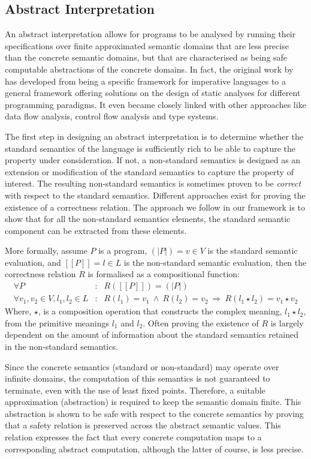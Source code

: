 \documentclass[10pt,a4paper,final,oneside,fleqn]{book}
\begin{document}
\subsection{Abstract Interpretation\label{introai}}
An abstract interpretation allows for programs to be analysed by running their specifications over finite approximated semantic domains that are less precise than the concrete semantic domains, but that are characterised as being safe computable abstractions of the concrete domains.  In fact, the original work by \cite{cousot1} has developed from being a specific framework for imperative languages to a general framework offering solutions on the design of static analyses for different programming paradigms.  It even became closely linked with other approaches like data flow analysis, control flow analysis and type systems.

The first step in designing an abstract interpretation is to determine whether the standard semantics of the language is sufficiently rich to be able to capture the property under consideration.  If not, a non-standard semantics is designed as an extension or modification of the standard semantics to capture the property of interest.  The resulting non-standard semantics is sometimes proven to be {\itshape correct\/} with respect to the standard semantics.  Different approaches exist for proving the existence of a correctness relation. The approach we follow in our framework is to show that for all the non-standard semantics elements, the standard semantic component can be extracted from these elements.

More formally, assume $P$ is a program, $(\!|P|\!)=v\in V$ is the standard semantic evaluation, and $[\![P]\!]=l\in L$ is the non-standard semantic evaluation, then the correctness relation $R$ is formalised as a compositional function:
\begin{eqnarray*}
\forall P&:&R([\![P]\!])=(\!|P|\!)\\
\forall v_1,v_2\in V,l_1,l_2\in L&:&R(l_1) = v_1~\wedge~R(l_2) = v_2~\Rightarrow~R(l_1\star l_2) = v_1\star v_2
\end{eqnarray*}
Where, $\star$, is a composition operation that constructs the complex meaning, $l_1\star l_2$, from the primitive meanings $l_1$ and $l_2$.  Often proving the existence of $R$ is largely dependent on the amount of information about the standard semantics retained in the non-standard semantics.

Since the concrete semantics (standard or non-standard) may operate over infinite domains, the computation of this semantics is not guaranteed to terminate, even with the use of least fixed points.  Therefore, a suitable approximation (abstraction) is required to keep the semantic domain finite.  This abstraction is shown to be safe with respect to the concrete semantics by proving that a safety relation is preserved across the abstract semantic values.  This relation expresses the fact that every concrete computation maps to a corresponding abstract computation, although the latter of course, is less precise.
\end{document}
